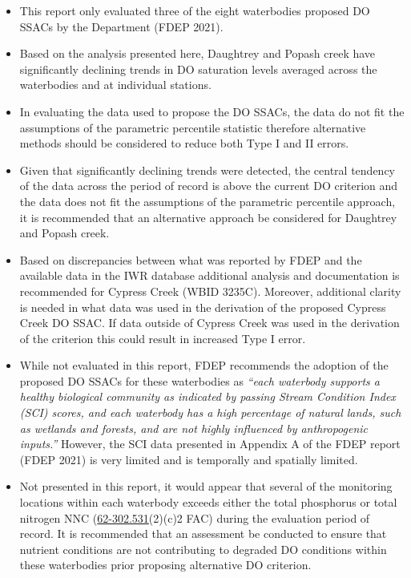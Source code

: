 \documentclass[]{interact}
\theoremstyle{plain}%
\theoremstyle{definition}
\theoremstyle{remark}
\begin{document}
\begin{itemize}
\item
  This report only evaluated three of the eight waterbodies proposed DO
  SSACs by the Department (FDEP 2021).
\item
  Based on the analysis presented here, Daughtrey and Popash creek have
  significantly declining trends in DO saturation levels averaged across
  the waterbodies and at individual stations.
\item
  In evaluating the data used to propose the DO SSACs, the data do not
  fit the assumptions of the parametric percentile statistic therefore
  alternative methods should be considered to reduce both Type I and II
  errors.
\item
  Given that significantly declining trends were detected, the central
  tendency of the data across the period of record is above the current
  DO criterion and the data does not fit the assumptions of the
  parametric percentile approach, it is recommended that an alternative
  approach be considered for Daughtrey and Popash creek.
\item
  Based on discrepancies between what was reported by FDEP and the
  available data in the IWR database additional analysis and
  documentation is recommended for Cypress Creek (WBID 3235C). Moreover,
  additional clarity is needed in what data was used in the derivation
  of the proposed Cypress Creek DO SSAC. If data outside of Cypress
  Creek was used in the derivation of the criterion this could result in
  increased Type I error.
\item
  While not evaluated in this report, FDEP recommends the adoption of
  the proposed DO SSACs for these waterbodies as \emph{``each waterbody
  supports a healthy biological community as indicated by passing Stream
  Condition Index (SCI) scores, and each waterbody has a high percentage
  of natural lands, such as wetlands and forests, and are not highly
  influenced by anthropogenic inputs.''} However, the SCI data presented
  in Appendix A of the FDEP report (FDEP 2021) is very limited and is
  temporally and spatially limited.
\item
  Not presented in this report, it would appear that several of the
  monitoring locations within each waterbody exceeds either the total
  phosphorus or total nitrogen NNC
  (\href{https://www.flrules.org/gateway/ruleno.asp?id=62-302.531}{62-302.531}(2)(c)2
  FAC) during the evaluation period of record. It is recommended that an
  assessment be conducted to ensure that nutrient conditions are not
  contributing to degraded DO conditions within these waterbodies prior
  proposing alternative DO criterion.
\end{itemize}
\end{document}
